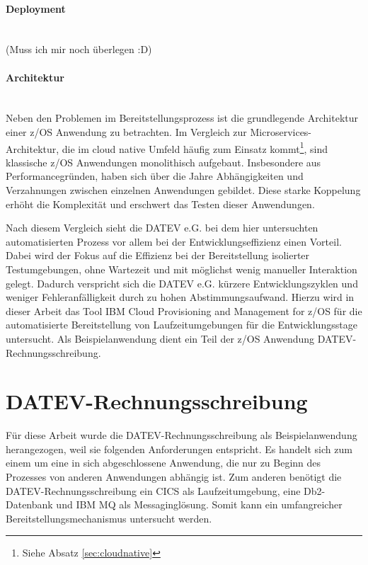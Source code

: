 \paragraph{Deployment}~\\
(Muss ich mir noch überlegen :D)

\paragraph{Architektur}~\\
Neben den Problemen im Bereitstellungsprozess ist die grundlegende Architektur einer z/OS Anwendung zu betrachten.
Im Vergleich zur \glqq Microservices\grqq-Architektur, die im cloud native Umfeld häufig zum Einsatz kommt\footnote{Siehe Absatz \ref{sec:cloudnative}}, sind klassische z/OS Anwendungen monolithisch aufgebaut.
Insbesondere aus Performancegründen, haben sich über die Jahre Abhängigkeiten und Verzahnungen zwischen einzelnen Anwendungen gebildet.
Diese starke Koppelung erhöht die Komplexität und erschwert das Testen dieser Anwendungen.

Nach diesem Vergleich sieht die DATEV e.G. bei dem hier untersuchten automatisierten Prozess vor allem bei der Entwicklungseffizienz einen Vorteil.
Dabei wird der Fokus auf die Effizienz bei der Bereitstellung isolierter Testumgebungen, ohne Wartezeit und mit möglichst wenig manueller Interaktion gelegt.
Dadurch verspricht sich die DATEV e.G. kürzere Entwicklungszyklen und weniger Fehleranfälligkeit durch zu hohen Abstimmungsaufwand.
Hierzu wird in dieser Arbeit das Tool \glqq IBM Cloud Provisioning and Management for z/OS\grqq{} für die automatisierte Bereitstellung von Laufzeitumgebungen für die Entwicklungsstage untersucht.
Als Beispielanwendung dient ein Teil der z/OS Anwendung \glqq DATEV-Rechnungsschreibung\grqq.

\section{DATEV-Rechnungsschreibung}\label{rechBesch}
Für diese Arbeit wurde die DATEV-Rechnungsschreibung als Beispielanwendung herangezogen, weil sie folgenden Anforderungen entspricht.
Es handelt sich zum einem um eine in sich abgeschlossene Anwendung, die nur zu Beginn des Prozesses von anderen Anwendungen abhängig ist.
Zum anderen benötigt die DATEV-Rechnungsschreibung ein CICS als Laufzeitumgebung, eine Db2-Datenbank und IBM MQ als Messaginglösung.
Somit kann ein umfangreicher Bereitstellungsmechanismus untersucht werden.

